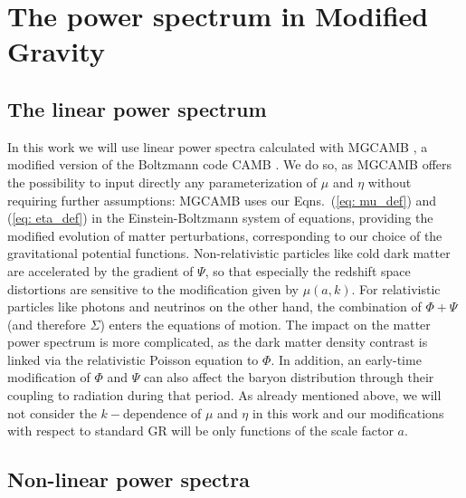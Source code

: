 \section{\label{sec:The-non-linear-power}The power spectrum in Modified
Gravity}


\subsection{The linear power spectrum}

In this work we will use linear power spectra calculated with MGCAMB
\cite{zhao_searching_2009,hojjati_testing_2011}, a modified version
of the Boltzmann code CAMB \cite{lewis_efficient_2000}. We do so,
as MGCAMB offers the possibility to input directly any parameterization
of $\mu$ and $\eta$ without requiring further assumptions:
MGCAMB uses our Eqns.\ (\ref{eq: mu_def}) and (\ref{eq: eta_def}) in the Einstein-Boltzmann
system of equations, providing the modified evolution of matter perturbations,
corresponding to our choice of the gravitational potential functions.
Non-relativistic particles like cold dark matter are accelerated by the
gradient of $\Psi$, so that especially the redshift space distortions are
sensitive to the modification given by $\mu(a,k)$. For relativistic particles
like photons and neutrinos on the other hand, the combination of $\Phi+\Psi$ (and therefore $\Sigma$)
enters the equations of motion. The impact on the matter power spectrum
is more complicated, as the dark matter density contrast is linked via
the relativistic Poisson equation to $\Phi$. In addition, an early-time
modification of $\Phi$ and $\Psi$ can also affect the baryon distribution through
their coupling to radiation during that period.
As already mentioned above, we will not consider
the $k-$dependence of $\mu$ and $\eta$ in this work and our modifications
with respect to standard GR will be only functions of the scale factor
$a$.


\subsection{Non-linear power spectra \label{sub:MG-nonlinear-spectra}}

